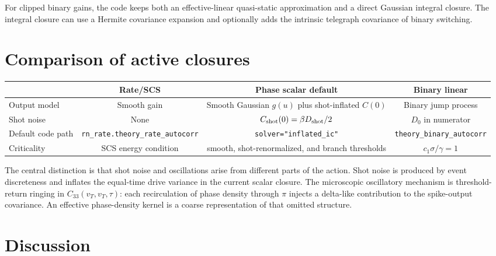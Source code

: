 \documentclass[pre,preprint,preprintnumbers,aps,eqsecnum,superscriptaddress,notitlepage,showpacs,floatfix]{revtex4-1}
\begin{document}
For clipped binary gains, the code keeps both an effective-linear
quasi-static approximation and a direct Gaussian integral closure.  The
integral closure can use a Hermite covariance expansion and optionally adds
the intrinsic telegraph covariance of binary switching.

\section{Comparison of active closures}
\label{sec:comparison}

\begin{center}
\renewcommand{\arraystretch}{1.4}
\begin{tabular}{lccc}
\hline
 & Rate/SCS & Phase scalar default & Binary linear \\
\hline
Output model
& Smooth gain
& Smooth Gaussian $g(u)$ plus shot-inflated $C(0)$
& Binary jump process \\
Shot noise
& None
& $C_{\rm shot}(0)=\beta D_{\rm shot}/2$
& $D_0$ in numerator \\
Default code path
& \texttt{rn\_rate.theory\_rate\_autocorr}
& \texttt{solver="inflated\_ic"}
& \texttt{theory\_binary\_autocorr}\\
Criticality
& SCS energy condition
& smooth, shot-renormalized, and branch thresholds
& $c_1\sigma/\gamma=1$\\
\hline
\end{tabular}
\end{center}

The central distinction is that shot noise and oscillations arise from
different parts of the action.  Shot noise is produced by event discreteness
and inflates the equal-time drive variance in the current scalar closure.
The microscopic oscillatory mechanism is threshold-return ringing in
$C_{33}(v_T,v_T,\tau)$: each recirculation of phase density through $\pi$
injects a delta-like contribution to the spike-output covariance.  An
effective phase-density kernel is a coarse representation of that omitted
structure.

\section{Discussion}
\label{sec:discussion}
\end{document}
